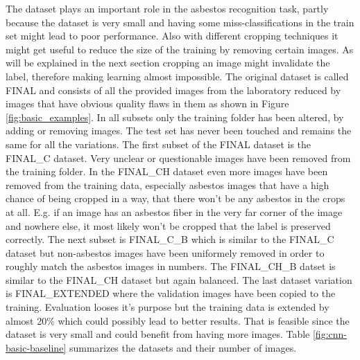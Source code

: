 The dataset plays an important role in the asbestos recognition task, partly because the dataset is very small and having some miss-classifications in the train set might lead to poor performance. Also with different cropping techniques it might get useful to reduce the size of the training by removing certain images. As will be explained in the next section cropping an image might invalidate the label, therefore making learning almost impossible. The original dataset is called FINAL and consists of all the provided images from the laboratory reduced by images that have obvious quality flaws in them as shown in Figure  \ref{fig:basic_examples}. In all subsets only the training folder has been altered, by adding or removing images. The test set has never been touched and remains the same for all the variations. The first subset of the FINAL dataset is the FINAL\_C dataset. Very unclear or questionable images have been removed from the training folder. In the FINAL\_CH dataset even more images have been removed from the training data, especially asbestos images that have a high chance of being cropped in a way, that there won't be any asbestos in the crops at all. E.g. if an image has an asbestos fiber in the very far corner of the image and nowhere else, it most likely won't be cropped that the label is preserved correctly. The next subset is FINAL\_C\_B which is similar to the FINAL\_C dataset but non-asbestos images have been uniformely removed in order to roughly match the asbestos images in numbers. The FINAL\_CH\_B datset is similar to the FINAL\_CH dataset but again balanced. The last dataset variation is FINAL\_EXTENDED where the validation images have been copied to the training. Evaluation looses it's purpose but the training data is extended by almost 20\% which could possibly lead to better results. That is feasible since the dataset is very small and could benefit from having more images. Table \ref{fig:cnn-basic-baseline} summarizes the datasets and their number of images.

